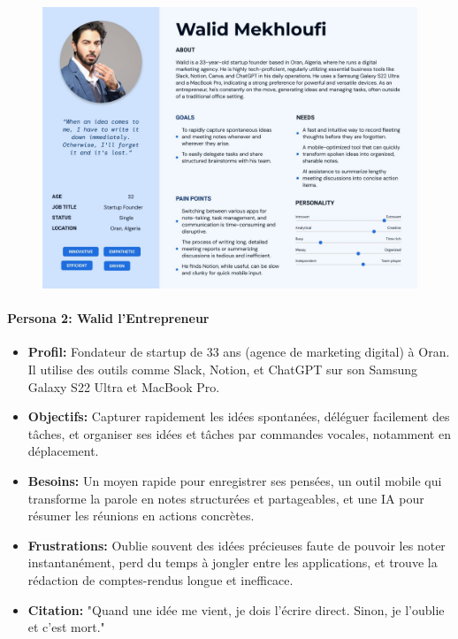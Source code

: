     \begin{figure}[H]
        \centering
        \includegraphics[width=\textwidth]{assets/docs/walid-persona.jpg}
    \end{figure}



    \paragraph{Persona 2: Walid l'Entrepreneur}

    \begin{itemize}
        \item \textbf{Profil:} Fondateur de startup de 33 ans (agence de marketing digital) à Oran. Il utilise des outils comme Slack, Notion, et ChatGPT sur son Samsung Galaxy S22 Ultra et MacBook Pro.
        \item \textbf{Objectifs:} Capturer rapidement les idées spontanées, déléguer facilement des tâches, et organiser ses idées et tâches par commandes vocales, notamment en déplacement.
        \item \textbf{Besoins:} Un moyen rapide pour enregistrer ses pensées, un outil mobile qui transforme la parole en notes structurées et partageables, et une IA pour résumer les réunions en actions concrètes.
        \item \textbf{Frustrations:} Oublie souvent des idées précieuses faute de pouvoir les noter instantanément, perd du temps à jongler entre les applications, et trouve la rédaction de comptes-rendus longue et inefficace.
        \item \textbf{Citation:} "Quand une idée me vient, je dois l’écrire direct. Sinon, je l’oublie et c’est mort."
    \end{itemize}
    
